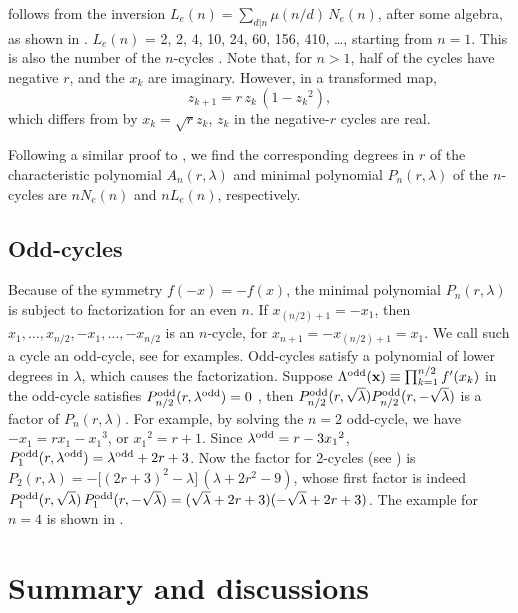 \documentclass[twocolumn]{revtex4-1}
\begin{document}
 follows from the inversion
  $L_e(n) = \sum_{d|n} \mu(n/d) \, N_e(n)$,
after some algebra, as shown in .
%
$L_e(n)$ = 2, 2, 4, 10, 24, 60, 156, 410, \ldots, starting from $n = 1$.
%
This is also the number of the $n$-cycles \cite{hao}.
Note that, for $n>1$, half of the cycles have negative $r$,
and the $x_k$ are imaginary.
However, in a transformed map,
\[
z_{k+1} = r \, z_k \, (1 - {z_k}^2),
\]
which differs from  by $x_k = \sqrt{r} z_k$,
$z_k$ in the negative-$r$ cycles are real.



Following a similar proof to ,
we find the corresponding degrees in $r$
of the characteristic polynomial $A_n(r, \lambda)$
  and minimal polynomial $P_n(r, \lambda)$ of the $n$-cycles
are $n N_e(n)$ and $n L_e(n)$, respectively.


\subsection{\label{sec:oddcycle}Odd-cycles}

Because of the symmetry $f(-x) = -f(x)$,
the minimal polynomial $P_n(r, \lambda)$
is subject to factorization for an even $n$.
%
If $x_{(n/2)+1} = -x_1$,
  then $x_1, \ldots, x_{n/2}, -x_1, \ldots, -x_{n/2}$
  is an $n$-cycle,
  for $x_{n+1} = - x_{(n/2)+1} = x_1$.
We call such a cycle an odd-cycle,
see  for examples.
%
Odd-cycles satisfy a polynomial
  of lower degrees in $\lambda$,
  which causes the factorization.
%
Suppose $\Lambda^{\mathrm{odd}}(\mathbf{x}) \equiv \prod_{k = 1}^{n/2} f'(x_k)$ in the odd-cycle
 satisfies $P_{n/2}^{\mathrm{odd}}(r, \lambda^{\mathrm{odd}}) = 0$
\big[where $\lambda^\odd$ is the value of $\Lambda^\odd(\vx)$,
and $\lambda^\odd = \pm\sqrt \lambda$\,\big],
then $P^{\mathrm{odd}}_{n/2}(r, \sqrt \lambda) P^{\mathrm{odd}}_{n/2}(r, -\sqrt \lambda)$
is a factor of $P_{n}(r, \lambda)$.
%
For example, by solving the $n = 2$ odd-cycle,
  we have $- x_1 = r x_1 - {x_1}^3$, or ${x_1}^2 = r + 1$.
Since $\lambda^{\mathrm{odd}} = r - 3 {x_1}^2$,
$P^{\mathrm{odd}}_1(r, \lambda^{\mathrm{odd}}) = \lambda^{\mathrm{odd}} + 2 r + 3$.
%
Now the factor for 2-cycles (see )
  is
  $P_2(r,\lambda) = -\big[(2r+3)^2 - \lambda\big]\,(\lambda + 2r^2-9)$,
  whose first factor is indeed
  $P^{\mathrm{odd}}_1(r, \sqrt \lambda) \, P^{\mathrm{odd}}_1(r, -\sqrt \lambda)
   = (\sqrt \lambda + 2 r + 3)(-\sqrt \lambda + 2 r + 3)$.
%
The example for $n=4$ is shown in .




\section{\label{sec:end}Summary and discussions}
\end{document}
